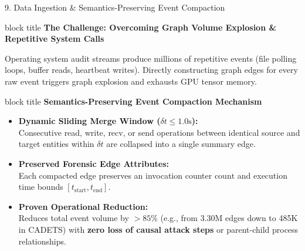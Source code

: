 \documentclass[aspectratio=169,10pt]{beamer}
\begin{document}
\begin{frame}{9. Data Ingestion \& Semantics-Preserving Event Compaction}
\vspace{-0.2em}
\begin{beamercolorbox}[rounded=true,shadow=false,sep=0.30em,wd=\textwidth]{block title}
\textbf{\scriptsize The Challenge: Overcoming Graph Volume Explosion \& Repetitive System Calls}
\end{beamercolorbox}
\vspace{0.12em}
{\fontsize{7.5pt}{10.6pt}\selectfont
Operating system audit streams produce millions of repetitive events (file polling loops, buffer reads, heartbeat writes). Directly constructing graph edges for every raw event triggers graph explosion and exhausts GPU tensor memory.
}

\vspace{0.30em}

\begin{beamercolorbox}[rounded=true,shadow=false,sep=0.30em,wd=\textwidth]{block title}
\textbf{\scriptsize Semantics-Preserving Event Compaction Mechanism}
\end{beamercolorbox}
\vspace{0.12em}
{\fontsize{7.5pt}{10.6pt}\selectfont
\begin{itemize}\itemsep0.22em
  \item \textbf{Dynamic Sliding Merge Window ($\delta t \le 1.0\text{s}$):}\\
  Consecutive read, write, recv, or send operations between identical source and target entities within $\delta t$ are collapsed into a single summary edge.
  \item \textbf{Preserved Forensic Edge Attributes:}\\
  Each compacted edge preserves an invocation counter $\text{count}$ and execution time bounds $[t_{\text{start}}, t_{\text{end}}]$.
  \item \textbf{Proven Operational Reduction:}\\
  Reduces total event volume by \textbf{$>85\%$} (e.g., from 3.30M edges down to 485K in CADETS) with \textbf{zero loss of causal attack steps} or parent-child process relationships.
\end{itemize}
}
\end{frame}
\end{document}

